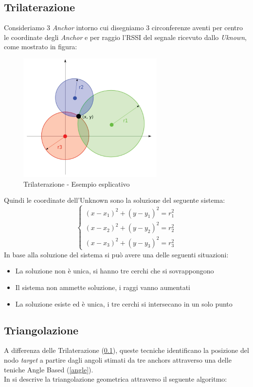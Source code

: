\subsection{Trilaterazione}
\label{trilaterazione}
Consideriamo 3 \textit{Anchor} intorno cui disegniamo 3 circonferenze aventi per centro le coordinate degli \textit{Anchor} e per raggio l'RSSI del segnale ricevuto dallo \textit{Uknown}, come mostrato in figura:
\begin{figure}[H]  
	\centering 
	\includegraphics[scale=0.8]{ContestoApplicativo/trilaterazione.png}
	\caption{Trilaterazione - Esempio esplicativo}
	\label{fig:trilaterazione}
\end{figure}
Quindi le coordinate dell'Unknown sono la soluzione del seguente sistema:
\begin{equation}
\begin{cases}
(x-x_1)^2 + (y-y_1)^2 = r_1^2\\
(x-x_2)^2 + (y-y_2)^2 = r_2^2\\
(x-x_3)^2 + (y-y_3)^2 = r_3^2
\end{cases}
\end{equation}
In base alla soluzione del sistema si può avere una delle seguenti situazioni:
\begin{itemize}
	\item La soluzione non è unica, si hanno tre cerchi che si sovrappongono
	\item Il sistema non ammette soluzione, i raggi vanno aumentati
	\item La soluzione esiste ed è unica, i tre cerchi si intersecano in un solo punto
\end{itemize}



\subsection{Triangolazione}
\label{triangolazione}
A differenza delle Trilaterazione (\ref{trilaterazione}), queste tecniche identificano la posizione del nodo \textit{target} a partire dagli angoli stimati da tre anchors attraverso una delle teniche Angle Based (\ref{angle}).\\
In \cite{triangolazione} si descrive la triangolazione geometrica attraverso il seguente algoritmo:\\

